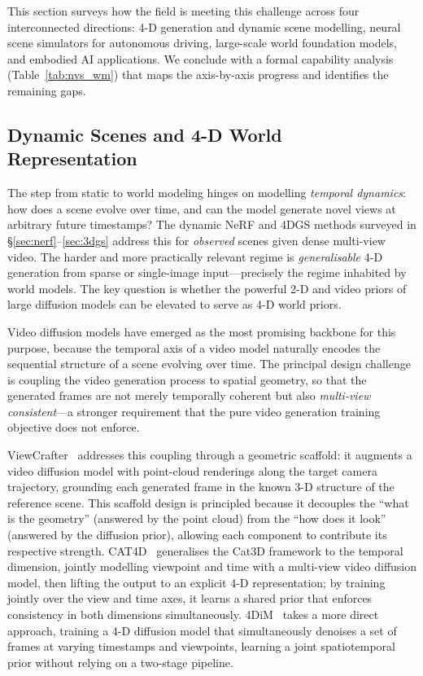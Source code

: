 This section surveys how the field is meeting this challenge across four
interconnected directions: 4-D generation and dynamic scene modelling,
neural scene simulators for autonomous driving, large-scale world foundation
models, and embodied AI applications.
We conclude with a formal capability analysis (Table~\ref{tab:nvs_wm}) that
maps the axis-by-axis progress and identifies the remaining gaps.

\subsection{Dynamic Scenes and 4-D World Representation}

The step from static \nvs{} to world modeling hinges on modelling
\emph{temporal dynamics}: how does a scene evolve over time, and can
the model generate novel views at arbitrary future timestamps?
The dynamic NeRF and 4DGS methods surveyed in \S\ref{sec:nerf}--\ref{sec:3dgs}
address this for \emph{observed} scenes given dense multi-view video.
The harder and more practically relevant regime is \emph{generalisable}
4-D generation from sparse or single-image input---precisely the regime
inhabited by world models.
The key question is whether the powerful 2-D and video priors of large
diffusion models can be elevated to serve as 4-D world priors.

Video diffusion models have emerged as the most promising backbone for this
purpose, because the temporal axis of a video model naturally encodes
the sequential structure of a scene evolving over time.
The principal design challenge is coupling the video generation process
to spatial geometry, so that the generated frames are not merely temporally
coherent but also \emph{multi-view consistent}---a stronger requirement
that the pure video generation training objective does not enforce.

ViewCrafter~\citep{yu2024viewcrafter} addresses this coupling through a
geometric scaffold: it augments a video diffusion model with point-cloud
renderings along the target camera trajectory, grounding each generated
frame in the known 3-D structure of the reference scene.
This scaffold design is principled because it decouples the ``what is the
geometry'' (answered by the point cloud) from the ``how does it look''
(answered by the diffusion prior), allowing each component to
contribute its respective strength.
CAT4D~\citep{wu2024cat4d} generalises the Cat3D framework to the temporal
dimension, jointly modelling viewpoint and time with a multi-view video
diffusion model, then lifting the output to an explicit 4-D representation;
by training jointly over the view and time axes, it learns a shared prior
that enforces consistency in both dimensions simultaneously.
4DiM~\citep{watson2024_4dim} takes a more direct approach, training a
4-D diffusion model that simultaneously denoises a set of frames at
varying timestamps and viewpoints, learning a joint spatiotemporal prior
without relying on a two-stage pipeline.

